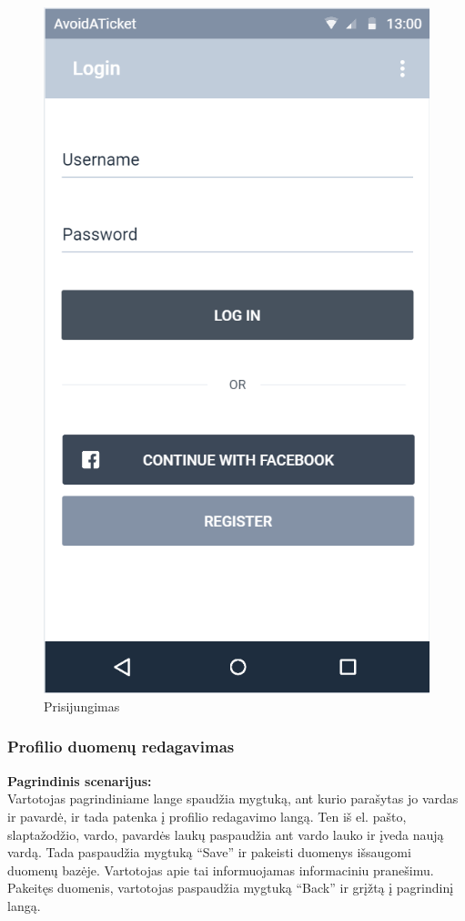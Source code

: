 \documentclass{VUMIFPSkursinis}
\begin{document}
	\begin{figure}[H]
				\centering
				\includegraphics[scale=0.3]{img/mockup_login}
				\caption{Prisijungimas}
				\label{img:prisijungimas}
			\end{figure}

\subsubsection{Profilio duomenų redagavimas}
	\textbf{Pagrindinis scenarijus:}\\
	Vartotojas pagrindiniame lange spaudžia mygtuką, ant kurio parašytas jo vardas ir pavardė, ir tada patenka į profilio 
	redagavimo langą. Ten iš el. pašto, slaptažodžio, vardo, pavardės laukų paspaudžia ant vardo lauko ir įveda naują vardą. 
	Tada paspaudžia mygtuką “Save” ir pakeisti duomenys išsaugomi duomenų bazėje. Vartotojas apie tai informuojamas informaciniu pranešimu. 
	Pakeitęs duomenis, vartotojas paspaudžia mygtuką “Back” ir grįžtą į pagrindinį langą.
\end{document}
